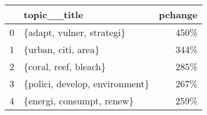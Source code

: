 \begin{tabular}{llr}
\toprule
{} &                    topic\_\_title &  pchange \\
\midrule
0 &       \{adapt, vulner, strategi\} &     450\% \\
1 &             \{urban, citi, area\} &     344\% \\
2 &           \{coral, reef, bleach\} &     285\% \\
3 &  \{polici, develop, environment\} &     267\% \\
4 &       \{energi, consumpt, renew\} &     259\% \\
\bottomrule
\end{tabular}
